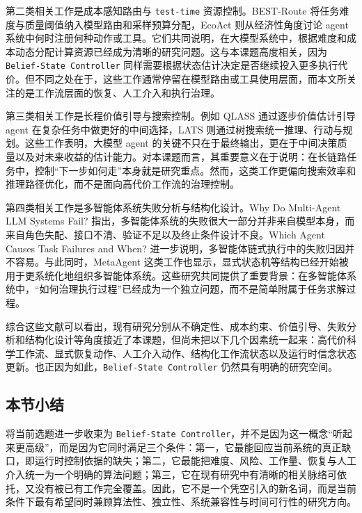 第二类相关工作是成本感知路由与 \texttt{test-time} 资源控制。BEST-Route\parencite{best-route} 将任务难度与质量阈值纳入模型路由和采样预算分配，EcoAct\parencite{ecoact} 则从经济性角度讨论 agent 系统中何时注册何种动作或工具。它们共同说明，在大模型系统中，根据难度和成本动态分配计算资源已经成为清晰的研究问题。这与本课题高度相关，因为 \texttt{Belief-State Controller} 同样需要根据状态估计决定是否继续投入更多执行代价。但不同之处在于，这些工作通常停留在模型路由或工具使用层面，而本文所关注的是工作流层面的恢复、人工介入和执行治理。

第三类相关工作是长程价值引导与搜索控制。例如 QLASS\parencite{qlass} 通过逐步价值估计引导 agent 在复杂任务中做更好的中间选择，LATS\parencite{lats} 则通过树搜索统一推理、行动与规划。这些工作表明，大模型 agent 的关键不只在于最终输出，更在于中间决策质量以及对未来收益的估计能力。对本课题而言，其重要意义在于说明：在长链路任务中，控制“下一步如何走”本身就是研究重点。然而，这类工作更偏向搜索效率和推理路径优化，而不是面向高代价工作流的治理控制。

第四类相关工作是多智能体系统失败分析与结构化设计。Why Do Multi-Agent LLM Systems Fail?\parencite{whyfail} 指出，多智能体系统的失败很大一部分并非来自模型本身，而来自角色失配、接口不清、验证不足以及终止条件设计不良。Which Agent Causes Task Failures and When?\parencite{whichandwhen} 进一步说明，多智能体链式执行中的失败归因并不容易。与此同时，MetaAgent\parencite{metaagent} 这类工作也显示，显式状态机等结构已经开始被用于更系统化地组织多智能体系统。这些研究共同提供了重要背景：在多智能体系统中，“如何治理执行过程”已经成为一个独立问题，而不是简单附属于任务求解过程。

综合这些文献可以看出，现有研究分别从不确定性、成本约束、价值引导、失败分析和结构化设计等角度接近了本课题，但尚未把以下几个因素统一起来：高代价科学工作流、显式恢复动作、人工介入动作、结构化工作流状态以及运行时信念状态更新。也正因为如此，\texttt{Belief-State Controller} 仍然具有明确的研究空间。

\subsection{本节小结}

将当前选题进一步收束为 \texttt{Belief-State Controller}，并不是因为这一概念“听起来更高级”，而是因为它同时满足三个条件：第一，它最能回应当前系统的真正缺口，即运行时控制依据的缺失；第二，它最能把难度、风险、工作量、恢复与人工介入统一为一个明确的算法问题；第三，它在现有研究中有清晰的相关脉络可依托，又没有被已有工作完全覆盖。因此，它不是一个凭空引入的新名词，而是当前条件下最有希望同时兼顾算法性、独立性、系统兼容性与时间可行性的研究方向。
